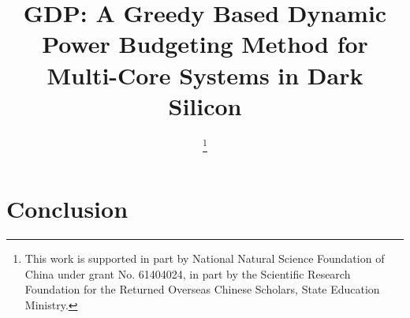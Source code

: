 \documentclass{IEEEtran}
\begin{document}
%
\title{GDP: A Greedy Based Dynamic Power Budgeting Method for Multi-Core
  Systems in Dark Silicon}



\author{

 \thanks{
This work is supported in part by National Natural Science Foundation of China under grant No. 61404024, in part by the Scientific Research Foundation for the Returned Overseas Chinese Scholars, State Education Ministry.
}
}

\maketitle

\begin{abstract}

\end{abstract}
\maketitle









\section{Conclusion}\label{sec:conclusion}




\end{document}

